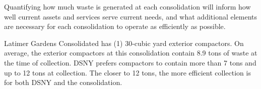 
    Quantifying how much waste is generated at each consolidation will inform how well current assets and services serve current needs, and what additional elements are necessary for each consolidation to operate as efficiently as possible.
    
    Latimer Gardens Consolidated has (1) 30-cubic yard exterior compactors. On average, the exterior compactors at this consolidation contain 8.9 tons of waste at the time of collection. DSNY prefers compactors to contain more than 7 tons and up to 12 tons at collection. The closer to 12 tons, the more efficient collection is for both DSNY and the consolidation.
